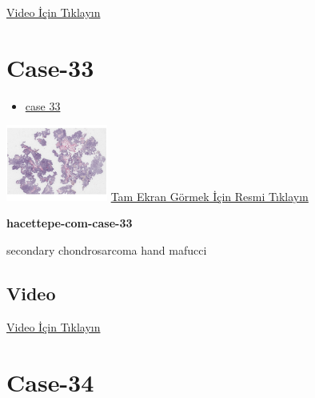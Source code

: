 \documentclass[
  letterpaper,
  DIV=11,
  numbers=noendperiod]{scrreprt}
\providecommand{\tightlist}{%
  \setlength{\itemsep}{0pt}\setlength{\parskip}{0pt}}\usepackage{longtable,booktabs,array}
\begin{document}
\href{https://www.youtube.com/watch?v=mnLIi1sNnlQ}{Video İçin Tıklayın}

\hypertarget{sec-hacettepe-case-of-the-month-case-33}{%
\section{Case-33}\label{sec-hacettepe-case-of-the-month-case-33}}

\begin{itemize}
\tightlist
\item
  \href{https://www.youtube.com/watch?v=iWDCr1XysLk\&ab_channel=KemalKosemehmetoglu}{case
  33}
\end{itemize}

\href{https://images.patolojiatlasi.com/hacettepe-com-case-33/HE.html}{\includegraphics[width=0.25\textwidth,height=\textheight]{./screenshots/thumbnail_hacettepe-com-case-33.png}}
\href{https://images.patolojiatlasi.com/hacettepe-com-case-33/HE.html}{Tam
Ekran Görmek İçin Resmi Tıklayın}

\textbf{hacettepe-com-case-33}

\begin{tcolorbox}[enhanced jigsaw, colbacktitle=quarto-callout-tip-color!10!white, colback=white, titlerule=0mm, opacityback=0, colframe=quarto-callout-tip-color-frame, opacitybacktitle=0.6, bottomrule=.15mm, breakable, coltitle=black, title=\textcolor{quarto-callout-tip-color}{\faLightbulb}\hspace{0.5em}{Tanı}, toprule=.15mm, toptitle=1mm, bottomtitle=1mm, arc=.35mm, rightrule=.15mm, leftrule=.75mm, left=2mm]

secondary chondrosarcoma hand mafucci

\end{tcolorbox}

\hypertarget{video-31}{%
\subsection{Video}\label{video-31}}

\href{https://www.youtube.com/watch?v=iWDCr1XysLk}{Video İçin Tıklayın}

\hypertarget{sec-hacettepe-case-of-the-month-case-34}{%
\section{Case-34}\label{sec-hacettepe-case-of-the-month-case-34}}
\end{document}
